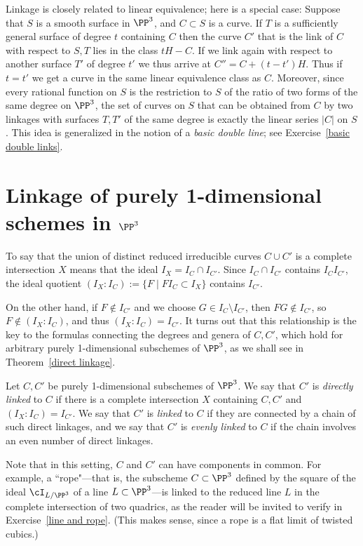 \begin{remark}
Linkage is closely related to linear equivalence; here is a special case:
Suppose that $S$ is a smooth surface in $\PP^3$, and $C\subset S$ is a curve. If $T$ is a sufficiently general surface of degree $t$
containing $C$ then the curve $C'$ that is the link of $C$ with respect to $S,T$ lies in the class $tH-C$. If we link again with
respect to another surface $T'$ of degree $t'$ we thus arrive at $C'' = C+(t-t')H$. Thus if $t=t'$ we get a curve in the same 
linear equivalence class as $C$. Moreover, since every rational function on $S$ is the restriction to $S$ of the ratio of two forms of the same degree on $\PP^3$,
the set of curves on $S$ that can be obtained from $C$ by two linkages with surfaces $T, T'$ of the same degree is exactly the 
linear series $|C|$ on $S$. This idea is generalized in the notion of a \emph{basic double line}; see 
Exercise~\ref{basic double links}.
\end{remark}

\section{Linkage of purely 1-dimensional schemes in $\PP^3$}
To say that the union of distinct reduced irreducible curves $C\cup C'$  is a complete intersection $X$ means that 
the ideal $I_X =I_C\cap I_{C'}$. Since  $I_C\cap I_{C'}$ contains $I_CI_{C'}$, the ideal quotient
$(I_X:I_C) := \{F \mid FI_C\subset I_X\}$
contains $I_{C'}$. 

On the other hand, if $F \notin I_{C'}$ and we choose $G\in I_C\setminus I_{C'}$, then $FG\notin I_{C'}$, so 
$F\notin (I_X:I_C)$, and thus
$(I_X:I_C) = I_{C'}$. It turns out that this relationship is the key to the formulas connecting the degrees and genera of $C,C'$, which hold 
for arbitrary purely 1-dimensional subschemes of $\PP^3$, as we shall see in Theorem~\ref{direct linkage}. 

\begin{definition}\label{linkage def}
Let $C,C'$ be purely 1-dimensional subschemes of $\PP^3$. We say that $C'$ is \emph{directly linked} to $C$ if there is a complete
intersection $X$ containing $C,C'$ and $(I_X:I_C) = I_{C'}$. We say that $C'$ is \emph{linked} to $C$ if they are connected by a chain of such
direct linkages, and we say that $C'$ is \emph{evenly linked} to $C$ if the chain involves an even number of direct linkages.
\end{definition}

Note that in this setting, $C$ and $C'$ can have components in common. For example, a ``rope"---that is, the subscheme $C \subset \PP^3$ defined by the square of the ideal $\cI_{L/\PP^3}$ of a line $L \subset \PP^3$---is linked to the reduced line $L$ in the complete intersection of two quadrics, as the reader will be invited to verify in Exercise~\ref{line and rope}. (This makes sense, since a rope is a flat limit of twisted cubics.)

